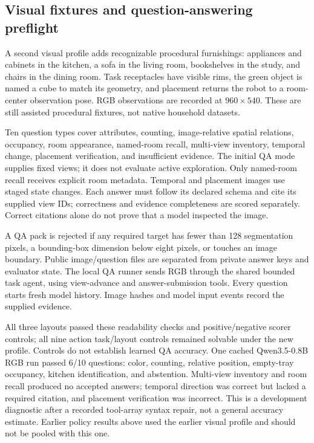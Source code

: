 \subsection{Visual fixtures and question-answering preflight}
A second visual profile adds recognizable procedural furnishings: appliances and
cabinets in the kitchen, a sofa in the living room, bookshelves in the study, and
chairs in the dining room. Task receptacles have visible rims, the green object
is named a cube to match its geometry, and placement returns the robot to a
room-center observation pose. RGB observations are recorded at $960\times540$.
These are still assisted procedural fixtures, not native household datasets.

Ten question types cover attributes, counting, image-relative spatial relations,
occupancy, room appearance, named-room recall, multi-view inventory, temporal
change, placement verification, and insufficient evidence. The initial QA mode
supplies fixed views; it does not evaluate active exploration. Only named-room
recall receives explicit room metadata. Temporal and placement images use staged
state changes. Each answer must follow its declared schema and cite its supplied
view IDs; correctness and evidence completeness are scored separately. Correct
citations alone do not prove that a model inspected the image.

A QA pack is rejected if any required target has fewer than 128 segmentation
pixels, a bounding-box dimension below eight pixels, or touches an image boundary.
Public image/question files are separated from private answer keys and evaluator
state. The local QA runner sends RGB through the shared bounded task agent, using
view-advance and answer-submission tools. Every question starts fresh model
history. Image hashes and model input events record the supplied evidence.

All three layouts passed these readability checks and positive/negative scorer
controls; all nine action task/layout controls remained solvable under the new
profile. Controls do not establish learned QA accuracy. One cached Qwen3.5-0.8B RGB
run passed 6/10 questions: color, counting, relative position, empty-tray occupancy,
kitchen identification, and abstention. Multi-view inventory and room recall
produced no accepted answers; temporal direction was correct but lacked a required
citation, and placement verification was incorrect. This is a development
diagnostic after a recorded tool-array syntax repair, not a general accuracy estimate.
Earlier policy results
above used the earlier visual profile and should not be pooled with this one.

